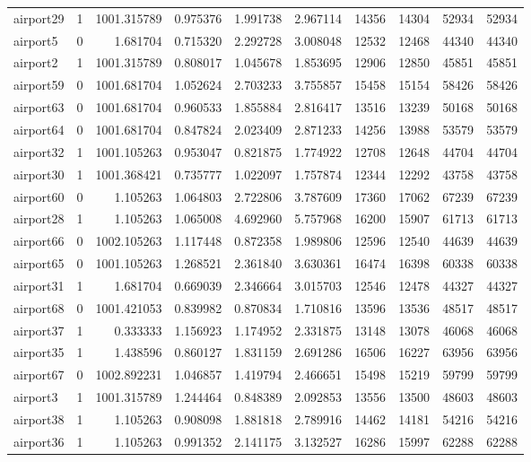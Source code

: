 \begin{longtable}{|l|r|r|r|r|r|r|r|r|r|}
airport29 & 1 & 1001.315789 & 0.975376 & 1.991738 & 2.967114 & 14356 & 14304 & 52934 & 52934 \\
airport5 & 0 & 1.681704 & 0.715320 & 2.292728 & 3.008048 & 12532 & 12468 & 44340 & 44340 \\
airport2 & 1 & 1001.315789 & 0.808017 & 1.045678 & 1.853695 & 12906 & 12850 & 45851 & 45851 \\
airport59 & 0 & 1001.681704 & 1.052624 & 2.703233 & 3.755857 & 15458 & 15154 & 58426 & 58426 \\
airport63 & 0 & 1001.681704 & 0.960533 & 1.855884 & 2.816417 & 13516 & 13239 & 50168 & 50168 \\
airport64 & 0 & 1001.681704 & 0.847824 & 2.023409 & 2.871233 & 14256 & 13988 & 53579 & 53579 \\
airport32 & 1 & 1001.105263 & 0.953047 & 0.821875 & 1.774922 & 12708 & 12648 & 44704 & 44704 \\
airport30 & 1 & 1001.368421 & 0.735777 & 1.022097 & 1.757874 & 12344 & 12292 & 43758 & 43758 \\
airport60 & 0 & 1.105263 & 1.064803 & 2.722806 & 3.787609 & 17360 & 17062 & 67239 & 67239 \\
airport28 & 1 & 1.105263 & 1.065008 & 4.692960 & 5.757968 & 16200 & 15907 & 61713 & 61713 \\
airport66 & 0 & 1002.105263 & 1.117448 & 0.872358 & 1.989806 & 12596 & 12540 & 44639 & 44639 \\
airport65 & 0 & 1001.105263 & 1.268521 & 2.361840 & 3.630361 & 16474 & 16398 & 60338 & 60338 \\
airport31 & 1 & 1.681704 & 0.669039 & 2.346664 & 3.015703 & 12546 & 12478 & 44327 & 44327 \\
airport68 & 0 & 1001.421053 & 0.839982 & 0.870834 & 1.710816 & 13596 & 13536 & 48517 & 48517 \\
airport37 & 1 & 0.333333 & 1.156923 & 1.174952 & 2.331875 & 13148 & 13078 & 46068 & 46068 \\
airport35 & 1 & 1.438596 & 0.860127 & 1.831159 & 2.691286 & 16506 & 16227 & 63956 & 63956 \\
airport67 & 0 & 1002.892231 & 1.046857 & 1.419794 & 2.466651 & 15498 & 15219 & 59799 & 59799 \\
airport3 & 1 & 1001.315789 & 1.244464 & 0.848389 & 2.092853 & 13556 & 13500 & 48603 & 48603 \\
airport38 & 1 & 1.105263 & 0.908098 & 1.881818 & 2.789916 & 14462 & 14181 & 54216 & 54216 \\
airport36 & 1 & 1.105263 & 0.991352 & 2.141175 & 3.132527 & 16286 & 15997 & 62288 & 62288 \\

\end{longtable}

